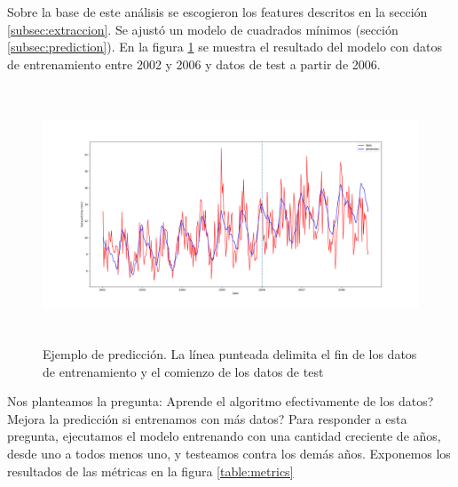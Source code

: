Sobre la base de este an\'alisis se escogieron los features descritos en la secci\'on \ref{subsec:extraccion}.
Se ajust\'o un modelo de cuadrados m\'inimos (secci\'on \ref{subsec:prediction}).
En la figura \ref{fig:example_fit_prediction} se muestra el resultado del modelo con datos de entrenamiento
entre 2002 y 2006 y datos de test a partir de 2006.

\begin{figure}[hbtp]
  \centering
  \includegraphics[width=\textwidth, height=3in]{plots/example_fit_and_prediction.png}
  \caption{Ejemplo de predicci\'on. La l\'inea punteada delimita el fin de los datos de
  entrenamiento y el comienzo de los datos de test}
  \label{fig:example_fit_prediction}
\end{figure}

Nos planteamos la pregunta: \textquestiondown Aprende el algoritmo efectivamente de los datos? \textquestiondown Mejora la predicci\'on si
entrenamos con m\'as datos? Para responder a esta pregunta, ejecutamos el modelo entrenando con una cantidad
creciente de a\~nos, desde uno a todos menos uno, y testeamos contra los dem\'as a\~nos. Exponemos
los resultados de las m\'etricas en la figura \ref{table:metrics}

